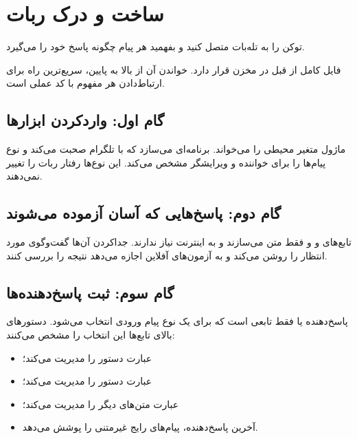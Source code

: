\chapter{ساخت و درک ربات}

\begin{goalbox}
توکن را به تله‌بات متصل کنید و بفهمید هر پیام چگونه پاسخ خود را می‌گیرد.
\end{goalbox}

فایل کامل از قبل در مخزن قرار دارد. خواندن آن از بالا به پایین، سریع‌ترین راه
برای ارتباط‌دادن هر مفهوم با کد عملی است.

\begin{LTR}

\end{LTR}

\section{گام اول: واردکردن ابزارها}

ماژول
متغیر محیطی را می‌خواند.
برنامه‌ای می‌سازد که با تلگرام صحبت می‌کند و
نوع پیام‌ها را برای خواننده و ویرایشگر مشخص می‌کند. این نوع‌ها رفتار ربات را
تغییر نمی‌دهند.

\section{گام دوم: پاسخ‌هایی که آسان آزموده می‌شوند}

تابع‌های
و
و
فقط متن می‌سازند و به اینترنت نیاز ندارند. جداکردن آن‌ها گفت‌وگوی مورد انتظار
را روشن می‌کند و به آزمون‌های آفلاین اجازه می‌دهد نتیجه را بررسی کنند.

\section{گام سوم: ثبت پاسخ‌دهنده‌ها}

پاسخ‌دهنده یا
فقط تابعی است که برای یک نوع پیام ورودی انتخاب می‌شود. دستورهای بالای تابع‌ها
این انتخاب را مشخص می‌کنند:

\begin{itemize}
\item عبارت
دستور
را مدیریت می‌کند؛
\item عبارت
دستور
را مدیریت می‌کند؛
\item عبارت
متن‌های دیگر را مدیریت می‌کند؛
\item آخرین پاسخ‌دهنده، پیام‌های رایج غیرمتنی را پوشش می‌دهد.
\end{itemize}

